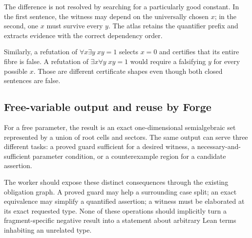 The difference is not resolved by searching for a particularly good constant. In the first sentence, the witness may depend on the universally chosen $x$; in the second, one $x$ must survive every $y$. The atlas retains the quantifier prefix and extracts evidence with the correct dependency order.

Similarly, a refutation of $\forall x\exists y\;xy=1$ selects $x=0$ and certifies that its entire fibre is false. A refutation of $\exists x\forall y\;xy=1$ would require a falsifying $y$ for every possible $x$. Those are different certificate shapes even though both closed sentences are false.

\subsection{Free-variable output and reuse by Forge}
For a free parameter, the result is an exact one-dimensional semialgebraic set represented by a union of root cells and sectors. The same output can serve three different tasks: a proved guard sufficient for a desired witness, a necessary-and-sufficient parameter condition, or a counterexample region for a candidate assertion.

The worker should expose these distinct consequences through the existing obligation graph. A proved guard may help a surrounding case split; an exact equivalence may simplify a quantified assertion; a witness must be elaborated at its exact requested type. None of these operations should implicitly turn a fragment-specific negative result into a statement about arbitrary Lean terms inhabiting an unrelated type.
